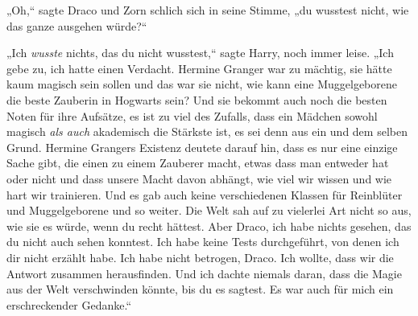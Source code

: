 „Oh,“ sagte Draco und Zorn schlich sich in seine Stimme, „du wusstest nicht, wie das ganze ausgehen würde?“

„Ich \emph{wusste} nichts, das du nicht wusstest,“ sagte Harry, noch immer leise. „Ich gebe zu, ich hatte einen Verdacht. Hermine Granger war zu mächtig, sie hätte kaum magisch sein sollen und das war sie nicht, wie kann eine Muggelgeborene die beste Zauberin in Hogwarts sein? Und sie bekommt auch noch die besten Noten für ihre Aufsätze, es ist zu viel des Zufalls, dass ein Mädchen sowohl magisch \emph{als auch} akademisch die Stärkste ist, es sei denn aus ein und dem selben Grund. Hermine Grangers Existenz deutete darauf hin, dass es nur eine einzige Sache gibt, die einen zu einem Zauberer macht, etwas dass man entweder hat oder nicht und dass unsere Macht davon abhängt, wie viel wir wissen und wie hart wir trainieren. Und es gab auch keine verschiedenen Klassen für Reinblüter und Muggelgeborene und so weiter. Die Welt sah auf zu vielerlei Art nicht so aus, wie sie es würde, wenn du recht hättest. Aber Draco, ich habe nichts gesehen, das du nicht auch sehen konntest. Ich habe keine Tests durchgeführt, von denen ich dir nicht erzählt habe. Ich habe nicht betrogen, Draco. Ich wollte, dass wir die Antwort zusammen herausfinden. Und ich dachte niemals daran, dass die Magie aus der Welt verschwinden könnte, bis du es sagtest. Es war auch für mich ein erschreckender Gedanke.“

